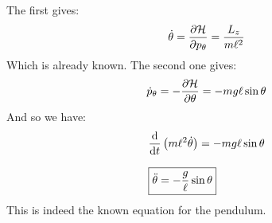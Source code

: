 The first \hamiltonref\;gives:
\begin{equation}
  \dot{\theta} = \pdv{\hamfun}{p_{\theta}} = \dfrac{L_z}{m\ell^2}
\end{equation}
Which is already known. The second one gives:
\begin{equation}
  \dot{p}_\theta = -\pdv{\hamfun}{\theta} = - mg \ell \sin \theta
\end{equation}
And so we have:
\begin{equation}
  \begin{split}
    &\dv{}{t}\brackets{m\ell^2\dot{\theta}} = - mg \ell \sin \theta \\[8pt]
    &\boxed{\ddot{\theta} = - \dfrac{g}{\ell} \sin \theta}
  \end{split}
\end{equation}
This is indeed the known equation for the pendulum.\\
